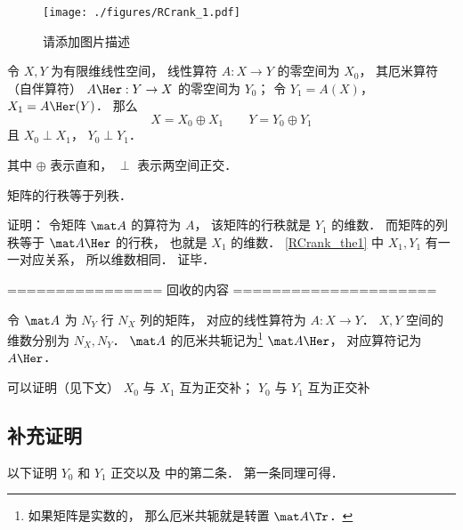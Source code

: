
\begin{issues}
\issueDraft
\end{issues}


\begin{figure}[ht]
\centering
\texttt{[image: ./figures/RCrank\_1.pdf]}
\caption{请添加图片描述} \label{RCrank_fig1}
\end{figure}

\begin{theorem}{}\label{RCrank_the1}
令 $X, Y$ 为有限维线性空间， 线性算符 $A:X \to Y$ 的零空间为 $X_0$， 其厄米算符（自伴算符） $A\Her: Y \to X$ 的零空间为 $Y_0$； 令 $Y_1 = A(X)$， $X_1 = A\Her(Y)$． 那么
\begin{equation}
X = X_0 \oplus X_1 \qquad Y = Y_0 \oplus Y_1
\end{equation}
且 $X_0 \perp X_1$， $Y_0 \perp Y_1$．
\end{theorem}
其中 $\oplus$ 表示直和， $\perp$ 表示两空间正交．


\begin{corollary}{}
矩阵的行秩等于列秩．
\end{corollary}
证明： 令矩阵 $\mat A$ 的算符为 $A$， 该矩阵的行秩就是 $Y_1$ 的维数． 而矩阵的列秩等于 $\mat A\Her$ 的行秩， 也就是 $X_1$ 的维数． \autoref{RCrank_the1} 中 $X_1, Y_1$ 有一一对应关系， 所以维数相同． 证毕．

================ 回收的内容 =====================

令 $\mat A$ 为 $N_Y$ 行 $N_X$ 列的矩阵， 对应的线性算符为 $A: X\to Y$． $X, Y$ 空间的维数分别为 $N_X, N_Y$． $\mat A$ 的厄米共轭记为\footnote{如果矩阵是实数的， 那么厄米共轭就是转置 $\mat A\Tr$．} $\mat A\Her$， 对应算符记为 $A\Her$．

可以证明（见下文） $X_0$ 与 $X_1$ 互为正交补； $Y_0$ 与 $Y_1$ 互为正交补

\subsection{补充证明}
以下证明 $Y_0$ 和 $Y_1$ 正交以及 中的第二条． 第一条同理可得．

